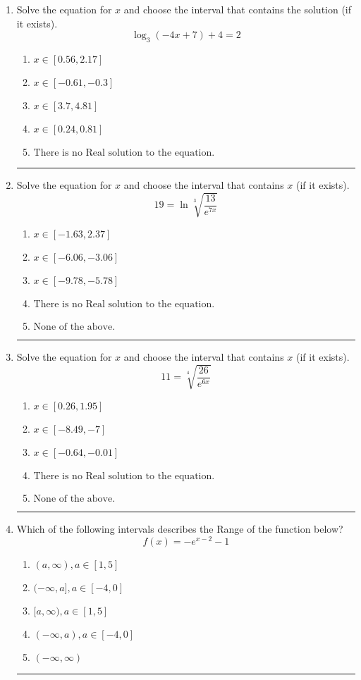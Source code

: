 \documentclass[14pt]{extbook}
\newcommand{\litem}[1]{\item#1\hspace*{-1cm}\rule{\textwidth}{0.4pt}}
\begin{document}
\begin{enumerate}
{\begin{enumerate}[label=\Alph*.]
\end{enumerate} }
\litem{
Solve the equation for $x$ and choose the interval that contains the solution (if it exists).\[ \log_{3}{(-4x+7)}+4 = 2 \]\begin{enumerate}[label=\Alph*.]
\item \( x \in [0.56, 2.17] \)
\item \( x \in [-0.61, -0.3] \)
\item \( x \in [3.7, 4.81] \)
\item \( x \in [0.24, 0.81] \)
\item \( \text{There is no Real solution to the equation.} \)

\end{enumerate} }
\litem{
 Solve the equation for $x$ and choose the interval that contains $x$ (if it exists).\[  19 = \ln{\sqrt[3]{\frac{13}{e^{7x}}}} \]\begin{enumerate}[label=\Alph*.]
\item \( x \in [-1.63, 2.37] \)
\item \( x \in [-6.06, -3.06] \)
\item \( x \in [-9.78, -5.78] \)
\item \( \text{There is no Real solution to the equation.} \)
\item \( \text{None of the above.} \)

\end{enumerate} }
\litem{
 Solve the equation for $x$ and choose the interval that contains $x$ (if it exists).\[  11 = \sqrt[4]{\frac{26}{e^{6x}}} \]\begin{enumerate}[label=\Alph*.]
\item \( x \in [0.26, 1.95] \)
\item \( x \in [-8.49, -7] \)
\item \( x \in [-0.64, -0.01] \)
\item \( \text{There is no Real solution to the equation.} \)
\item \( \text{None of the above.} \)

\end{enumerate} }
\litem{
Which of the following intervals describes the Range of the function below?\[ f(x) = -e^{x-2}-1 \]\begin{enumerate}[label=\Alph*.]
\item \( (a, \infty), a \in [1, 5] \)
\item \( (-\infty, a], a \in [-4, 0] \)
\item \( [a, \infty), a \in [1, 5] \)
\item \( (-\infty, a), a \in [-4, 0] \)
\item \( (-\infty, \infty) \)


\end{enumerate}}
\end{enumerate}
\end{document}
